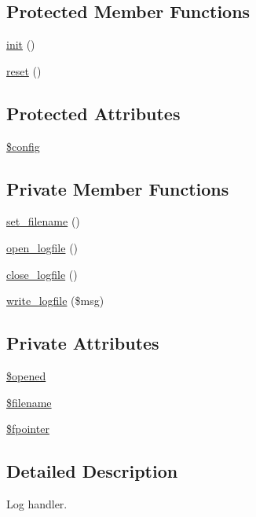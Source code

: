 \subsection*{Protected Member Functions}
\begin{CompactItemize}
\item 
\hyperlink{class__OWL_e0ef3ded56e8a6b34b6461e5a721cd3e}{init} ()
\item 
\hyperlink{class__OWL_2f2a042bcf31965194c03033df0edc9b}{reset} ()
\end{CompactItemize}
\subsection*{Protected Attributes}
\begin{CompactItemize}
\item 
\hyperlink{class__OWL_f37a011667dda12fc417a68a6f3077d1}{\$config}
\end{CompactItemize}
\subsection*{Private Member Functions}
\begin{CompactItemize}
\item 
\hyperlink{classLogHandler_65ef4f1c6ab4cff4057f5f5932cc690e}{set\_\-filename} ()
\item 
\hyperlink{classLogHandler_af324e5156bf8ea83e5b4e990ea99e2d}{open\_\-logfile} ()
\item 
\hyperlink{classLogHandler_1a3b03d9bb97404a4f746bd2aacc5a8c}{close\_\-logfile} ()
\item 
\hyperlink{classLogHandler_e0cd68fb6f068e47f899a1e4c7f29ba9}{write\_\-logfile} (\$msg)
\end{CompactItemize}
\subsection*{Private Attributes}
\begin{CompactItemize}
\item 
\hyperlink{classLogHandler_956e7e71a9ff96c6301d1f41a5bf207e}{\$opened}
\item 
\hyperlink{classLogHandler_b51c12bcd654093b9d0153ab38ebad8c}{\$filename}
\item 
\hyperlink{classLogHandler_d65c8954bda40d8a33828f0a0a2cbf5b}{\$fpointer}
\end{CompactItemize}


\subsection{Detailed Description}
Log handler. 

